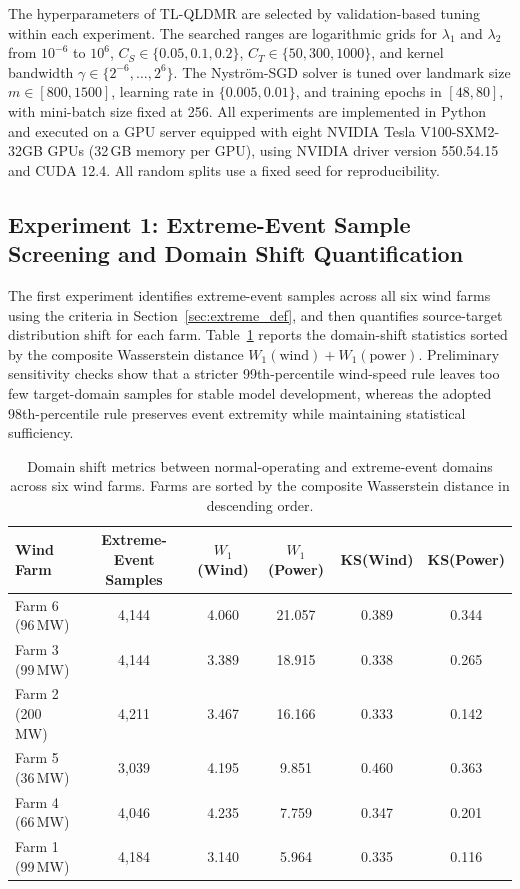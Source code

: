 \documentclass[a4paper]{cas-sc}
\begin{document}
The hyperparameters of TL-QLDMR are selected by validation-based tuning within each experiment. The searched ranges are logarithmic grids for $\lambda_1$ and $\lambda_2$ from $10^{-6}$ to $10^{6}$, $C_S \in \{0.05, 0.1, 0.2\}$, $C_T \in \{50, 300, 1000\}$, and kernel bandwidth $\gamma \in \{2^{-6}, \ldots, 2^{6}\}$. The Nystr\"{o}m-SGD solver is tuned over landmark size $m \in [800, 1500]$, learning rate in $\{0.005, 0.01\}$, and training epochs in $[48, 80]$, with mini-batch size fixed at 256. All experiments are implemented in Python and executed on a GPU server equipped with eight NVIDIA Tesla V100-SXM2-32GB GPUs (32\,GB memory per GPU), using NVIDIA driver version 550.54.15 and CUDA 12.4. All random splits use a fixed seed for reproducibility.


\subsection{Experiment 1: Extreme-Event Sample Screening and Domain Shift Quantification}\label{sec:exp1}

The first experiment identifies extreme-event samples across all six wind farms using the criteria in Section~\ref{sec:extreme_def}, and then quantifies source-target distribution shift for each farm. Table~\ref{tab:exp1_shift} reports the domain-shift statistics sorted by the composite Wasserstein distance $W_1(\text{wind}) + W_1(\text{power})$. Preliminary sensitivity checks show that a stricter 99th-percentile wind-speed rule leaves too few target-domain samples for stable model development, whereas the adopted 98th-percentile rule preserves event extremity while maintaining statistical sufficiency.

\begin{table}[ht]
\centering
\caption{Domain shift metrics between normal-operating and extreme-event domains across six wind farms. Farms are sorted by the composite Wasserstein distance in descending order.}
\setlength{\tabcolsep}{3mm}
\begin{tabular}{lccccc}
\toprule
Wind Farm & Extreme-Event Samples & $W_1$(Wind) & $W_1$(Power) & KS(Wind) & KS(Power) \\
\midrule
Farm 6 (96\,MW)  & 4{,}144 & 4.060 & 21.057 & 0.389 & 0.344 \\
Farm 3 (99\,MW)  & 4{,}144 & 3.389 & 18.915 & 0.338 & 0.265 \\
Farm 2 (200\,MW) & 4{,}211 & 3.467 & 16.166 & 0.333 & 0.142 \\
Farm 5 (36\,MW)  & 3{,}039 & 4.195 &  9.851 & 0.460 & 0.363 \\
Farm 4 (66\,MW)  & 4{,}046 & 4.235 &  7.759 & 0.347 & 0.201 \\
Farm 1 (99\,MW)  & 4{,}184 & 3.140 &  5.964 & 0.335 & 0.116 \\
\bottomrule
\end{tabular}
\label{tab:exp1_shift}
\end{table}
\end{document}
